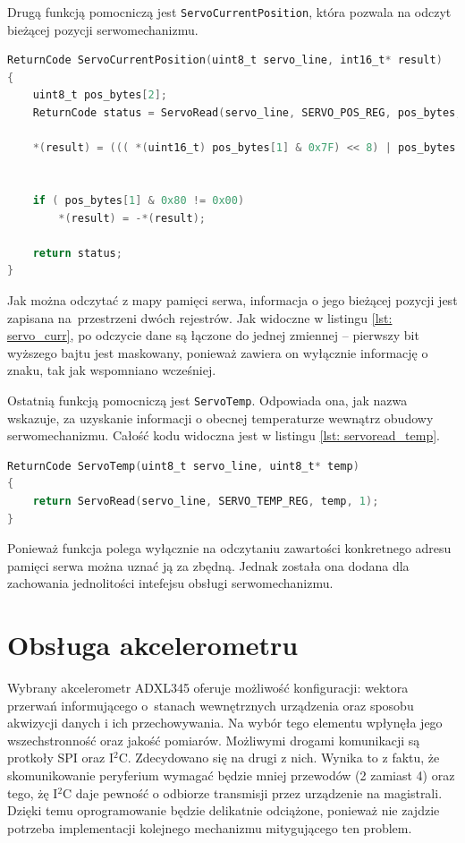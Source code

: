 Drugą funkcją pomocniczą jest \texttt{ServoCurrentPosition}, która pozwala na odczyt bieżącej pozycji serwomechanizmu. 
\begin{lstlisting}[language=C,
    caption={Funkcja \texttt{ServoCurrentPosition}},
    label={lst: servo_curr}]
ReturnCode ServoCurrentPosition(uint8_t servo_line, int16_t* result)
{
	uint8_t pos_bytes[2];
	ReturnCode status = ServoRead(servo_line, SERVO_POS_REG, pos_bytes, 2);

	*(result) = ((( *(uint16_t) pos_bytes[1] & 0x7F) << 8) | pos_bytes[0] );
	

	if ( pos_bytes[1] & 0x80 != 0x00)
		*(result) = -*(result);

	return status;
}
\end{lstlisting}
Jak można odczytać z mapy pamięci serwa, informacja o jego bieżącej pozycji jest zapisana na~przestrzeni dwóch rejestrów. Jak widoczne w listingu \ref{lst: servo_curr}, po odczycie dane są łączone do jednej zmiennej -- pierwszy bit wyższego bajtu jest maskowany, ponieważ zawiera on wyłącznie informację o znaku, tak jak wspomniano wcześniej. 

Ostatnią funkcją pomocniczą jest \texttt{ServoTemp}. Odpowiada ona, jak nazwa wskazuje, za uzyskanie informacji o obecnej temperaturze wewnątrz obudowy serwomechanizmu. Całość kodu widoczna jest w listingu \ref{lst: servoread_temp}.
\begin{lstlisting}[language=C,
    caption={Funkcja \texttt{ServoTemp}},
    label={lst: servoread_temp}]
ReturnCode ServoTemp(uint8_t servo_line, uint8_t* temp)
{
    return ServoRead(servo_line, SERVO_TEMP_REG, temp, 1);
}
\end{lstlisting}
Ponieważ funkcja polega wyłącznie na odczytaniu zawartości konkretnego adresu pamięci serwa można uznać ją za zbędną. Jednak została ona dodana dla zachowania jednolitości intefejsu obsługi serwomechanizmu.

\section{Obsługa akcelerometru}
 Wybrany akcelerometr ADXL345 oferuje możliwość konfiguracji: wektora przerwań informującego o~stanach wewnętrznych urządzenia oraz sposobu akwizycji danych i ich przechowywania. Na wybór tego elementu wpłynęła jego wszechstronność oraz jakość pomiarów. Możliwymi drogami komunikacji są protkoły SPI oraz I$^2$C. Zdecydowano się na drugi z nich. Wynika to z faktu, że skomunikowanie peryferium wymagać będzie mniej przewodów (2 zamiast 4) oraz tego, żę I$^2$C daje pewność o odbiorze transmisji przez urządzenie na magistrali. Dzięki temu oprogramowanie będzie delikatnie odciążone, ponieważ nie zajdzie potrzeba implementacji kolejnego mechanizmu mitygującego ten problem. 
 
